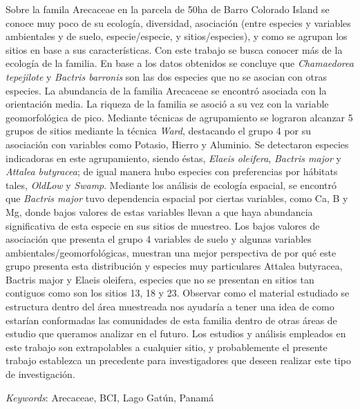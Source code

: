 \documentclass[11pt,]{article}
\renewenvironment{abstract}
 {{%
    \setlength{\leftmargin}{0mm}
    \setlength{\rightmargin}{\leftmargin}%
  }%
  \relax}
 {\endlist}
\begin{document}
\begin{abstract}

    \hbox{\vrule height .2pt width 39.14pc}

    \vskip 8.5pt %

\noindent Sobre la famila Arecaceae en la parcela de 50ha de Barro Colorado Island
se conoce muy poco de su ecología, diversidad, asociación (entre
especies y variables ambientales y de suelo, especie/especie, y
sitios/especies), y como se agrupan los sitios en base a sus
características. Con este trabajo se busca conocer más de la ecología de
la familia. En base a los datos obtenidos se concluye que
\emph{Chamaedorea tepejilote} y \emph{Bactris barronis} son las dos
especies que no se asocian con otras especies. La abundancia de la
familia Arecaceae se encontró asociada con la orientación media. La
riqueza de la familia se asoció a su vez con la variable geomorfológica
de pico. Mediante técnicas de agrupamiento se lograron alcanzar 5 grupos
de sitios mediante la técnica \emph{Ward}, destacando el grupo 4 por su
asociación con variables como Potasio, Hierro y Aluminio. Se detectaron
especies indicadoras en este agrupamiento, siendo éstas, \emph{Elaeis
oleifera}, \emph{Bactris major} y \emph{Attalea butyracea}; de igual
manera hubo especies con preferencias por hábitats tales, \emph{OldLow}
y \emph{Swamp}. Mediante los análisis de ecología espacial, se encontró
que \emph{Bactris major} tuvo dependencia espacial por ciertas
variables, como Ca, B y Mg, donde bajos valores de estas variables
llevan a que haya abundancia significativa de esta especie en sus sitios
de muestreo. Los bajos valores de asociación que presenta el grupo 4
variables de suelo y algunas variables ambientales/geomorfológicas,
muestran una mejor perspectiva de por qué este grupo presenta esta
distribución y especies muy particulares Attalea butyracea, Bactris
major y Elaeis oleifera, especies que no se presentan en sitios tan
contiguos como son los sitios 13, 18 y 23. Observar como el material
estudiado se estructura dentro del área muestreada nos ayudaría a tener
una idea de como estarían conformadas las comunidades de esta familia
dentro de otras áreas de estudio que queramos analizar en el futuro. Los
estudios y análisis empleados en este trabajo son extrapolables a
cualquier sitio, y probablemente el presente trabajo establezca un
precedente para investigadores que deseen realizar este tipo de
investigación.


\vskip 8.5pt \noindent \emph{Keywords}: Arecaceae, BCI, Lago Gatún, Panamá \par

    \hbox{\vrule height .2pt width 39.14pc}



\end{abstract}
\end{document}
